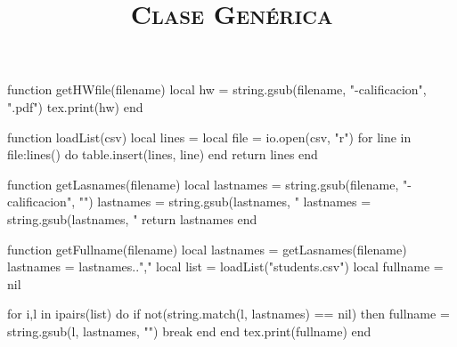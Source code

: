 \begin{luacode*}
    function getHWfile(filename)
        local hw = string.gsub(filename, "-calificacion", ".pdf")
        tex.print(hw)
    end

    function loadList(csv)
        local lines = {}
        local file = io.open(csv, "r")
        for line in file:lines() do
            table.insert(lines, line)
        end
        return lines
    end
        
    function getLasnames(filename)
       local lastnames = string.gsub(filename, "-calificacion", "") 
       lastnames = string.gsub(lastnames, "%
       lastnames = string.gsub(lastnames, "%
       return lastnames
    end

    function getFullname(filename)
       local lastnames = getLasnames(filename)
       lastnames = lastnames..","
       local list = loadList("students.csv") 
       local fullname = nil

       for i,l in ipairs(list) do
            if not(string.match(l, lastnames) == nil) then
                fullname = string.gsub(l, lastnames, "")
                break
            end
        end
       tex.print(fullname)
    end

\end{luacode*}

\title{\Large{\textsc{Clase Genérica}} \\ \LARGE{\work}}
\author{\fullname}
